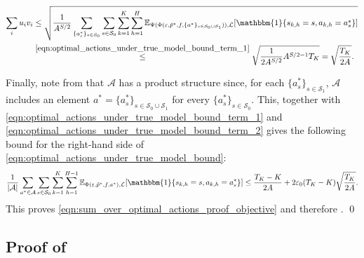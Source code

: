 \documentclass[11pt]{article}
\newcommand{\mcA}{\mathcal{A}}
\newcommand{\mcL}{\mathcal{L}}
\newcommand{\mcS}{\mathcal{S}}
\newcommand{\mbbE}{\mathbb{E}}
\theoremstyle{definition}
\theoremstyle{definition}
\begin{document}
\begin{align}
	\sum_{i}u_i v_i
	 &
	\leq
	\sqrt{
		\frac{1}{A^{S/2}}
		\sum_{\{a_s^*\}_{s\in\mcS_0}}
		\sum_{s\in\mcS_0}
		\sum_{k=1}^K
		\sum_{h=1}^{H}
		\mbbE_{\Psi(\Phi(\varepsilon,\tilde{p}^*,f,\{a^*\}_{s\in\mcS_0\cup\mcS_1})),\mcL}[
		\mathbbm{1}\{s_{k,h}=s,a_{k,h}=a_s^*\}
		]
	}
	\nonumber
	\\
	 &
	\overset{\eqref{eqn:optimal_actions_under_true_model_bound_term_1}}{\leq}
	\sqrt{\frac{1}{2A^{S/2}}A^{S/2-1}T_K}
	=
	\sqrt{\frac{T_K}{2A}}.
	\label{eqn:optimal_actions_under_true_model_bound_term_2}
\end{align}

Finally, note from  that $\mcA$ has a product structure since, for each $\{a_s^*\}_{s\in\mcS_1}$, $\mcA$ includes an element $a^*=\{a_s^*\}_{s\in\mcS_0\cup\mcS_1}$ for every $\{a_s^*\}_{s\in\mcS_0}$.
This, together with \eqref{eqn:optimal_actions_under_true_model_bound_term_1} and \eqref{eqn:optimal_actions_under_true_model_bound_term_2} gives the following bound for the right-hand side of \eqref{eqn:optimal_actions_under_true_model_bound}:
\begin{equation}
	\frac{1}{|\mcA|}
	\sum_{a^*\in\mcA}
	\sum_{s\in\mcS_0}
	\sum_{k=1}^K
	\sum_{h=1}^{H-1}
	\mbbE_{\Phi(\varepsilon,\tilde{p}^*,f,a^*),\mcL}[\mathbbm{1}\{s_{k,h}=s,a_{k,h}=a_s^*\}]
	\leq
	\frac{T_K-K}{2A}
	+
	2\varepsilon_0(T_K-K)\sqrt{\frac{T_K}{2A}}
	.
\end{equation}
This proves \eqref{eqn:sum_over_optimal_actions_proof_objective} and therefore .
\qed

\subsection{Proof of \texorpdfstring{}{transition regret lower bound}}
\label{sec:proof_of_transition_regret_lower_bound}
\end{document}
